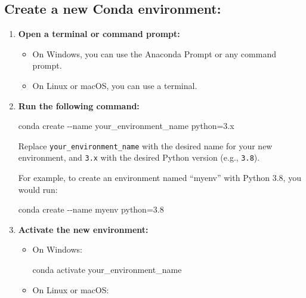 \documentclass[
  letterpaper,
  DIV=11,
  numbers=noendperiod]{scrreprt}
\newenvironment{Shaded}{\begin{snugshade}}{\end{snugshade}}
\newcommand{\AttributeTok}[1]{\textcolor[rgb]{0.40,0.45,0.13}{#1}}
\newcommand{\ExtensionTok}[1]{\textcolor[rgb]{0.00,0.23,0.31}{#1}}
\newcommand{\NormalTok}[1]{\textcolor[rgb]{0.00,0.23,0.31}{#1}}
\providecommand{\tightlist}{%
  \setlength{\itemsep}{0pt}\setlength{\parskip}{0pt}}\usepackage{longtable,booktabs,array}
\begin{document}
\begin{enumerate}
  \subsection{Create a new Conda
  environment:}\label{create-a-new-conda-environment}

  \begin{enumerate}
  \def\labelenumii{\arabic{enumii}.}
  \item
    \textbf{Open a terminal or command prompt:}

    \begin{itemize}
    \tightlist
    \item
      On Windows, you can use the Anaconda Prompt or any command prompt.
    \item
      On Linux or macOS, you can use a terminal.
    \end{itemize}
  \item
    \textbf{Run the following command:}

\begin{Shaded}
\begin{Highlighting}[]
\ExtensionTok{conda}\NormalTok{ create }\AttributeTok{{-}{-}name}\NormalTok{ your\_environment\_name python=3.x}
\end{Highlighting}
\end{Shaded}

    Replace \texttt{your\_environment\_name} with the desired name for
    your new environment, and \texttt{3.x} with the desired Python
    version (e.g., \texttt{3.8}).

    For example, to create an environment named ``myenv'' with Python
    3.8, you would run:

\begin{Shaded}
\begin{Highlighting}[]
\ExtensionTok{conda}\NormalTok{ create }\AttributeTok{{-}{-}name}\NormalTok{ myenv python=3.8}
\end{Highlighting}
\end{Shaded}
  \item
    \textbf{Activate the new environment:}

    \begin{itemize}
    \item
      On Windows:

\begin{Shaded}
\begin{Highlighting}[]
\ExtensionTok{conda}\NormalTok{ activate your\_environment\_name}
\end{Highlighting}
\end{Shaded}
    \item
      On Linux or macOS:


\end{itemize}
\end{enumerate}
\end{enumerate}
\end{document}
